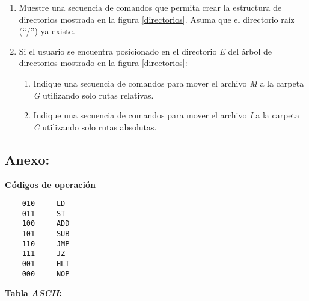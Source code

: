 \documentclass[12pt]{article}
\begin{document}
\begin{enumerate}
\begin{enumerate}
        \end{enumerate}

    \item Muestre una secuencia de comandos que permita crear la estructura de
        directorios mostrada en la figura \ref{directorios}. Asuma que el
        directorio raíz (“/”) ya existe.

    \item Si el usuario se encuentra posicionado en el directorio \emph{E} del
        árbol de directorios mostrado en la figura \ref{directorios}:

        \begin{enumerate}

            \item Indique una secuencia de comandos para mover el archivo
                \emph{M} a la carpeta \emph{G} utilizando solo rutas
                relativas.

            \item Indique una secuencia de comandos para mover el archivo
                \emph{I} a la carpeta \emph{C} utilizando solo rutas
                absolutas.

        \end{enumerate}

\end{enumerate}

\subsection*{ \large\textbf{Anexo:} }

\textbf{Códigos de operación}

\begin{verbatim}
    010     LD
    011     ST
    100     ADD
    101     SUB
    110     JMP
    111     JZ
    001     HLT
    000     NOP
\end{verbatim}

\textbf{Tabla \emph{ASCII}:}
\end{document}
